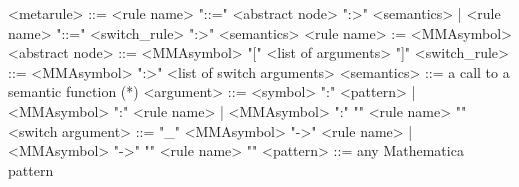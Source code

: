 <metarule> ::= <rule name> "::=" <abstract node> ":>" <semantics>
                       | <rule name> "::=" <switch_rule> ":>" <semantics>
<rule name> := <MMAsymbol>
<abstract node> ::= <MMAsymbol> "[" <list of arguments> "]"
<switch_rule> ::= <MMAsymbol> ":>" <list of switch arguments>
<semantics> ::= a call to a semantic function (*)
<argument> ::= <symbol> ":" <pattern>
                        | <MMAsymbol> ":" <rule name>
                        | <MMAsymbol> ":" "{" <rule name> "}"
<switch argument> ::= "_" <MMAsymbol> "->" <rule name>
						| <MMAsymbol> "->" "{" <rule name> "}"
<pattern> ::= any Mathematica pattern
